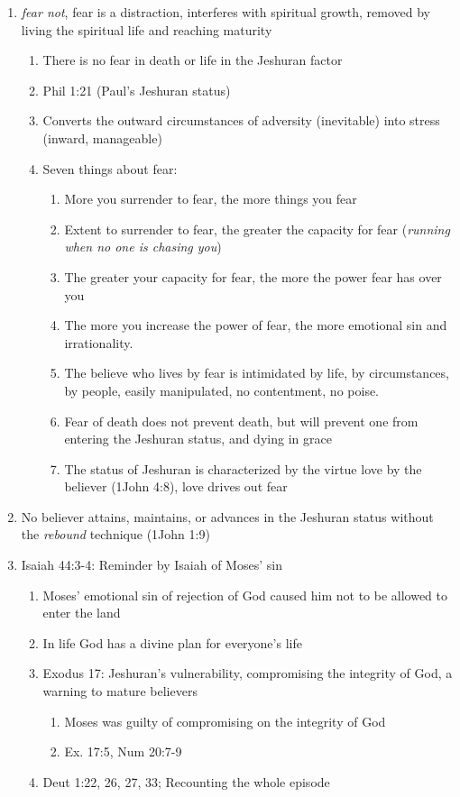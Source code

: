 \documentclass[11pt]{article}
\begin{document}
\begin{enumerate}
\begin{enumerate}
	\end{enumerate}
	\item \emph{fear not}, fear is a distraction, interferes with spiritual growth, removed by living the spiritual life and reaching maturity
	\begin{enumerate}
		\item There is no fear in death or life in the Jeshuran factor
		\item Phil 1:21 (Paul's Jeshuran status)
		\item Converts the outward circumstances of adversity (inevitable) into stress (inward, manageable)
		\item Seven things about fear:
		\begin{enumerate}
			\item More you surrender to fear, the more things you fear
			\item Extent to surrender to fear, the greater the capacity for fear (\emph{running when no one is chasing you})
			\item The greater your capacity for fear, the more the power fear has over you
			\item The more you increase the power of fear, the more emotional sin and irrationality. 
			\item The believe who lives by fear is intimidated by life, by circumstances, by people, easily manipulated, no contentment, no poise.
			\item Fear of death does not prevent death, but will prevent one from entering the Jeshuran status, and dying in grace
			\item The status of Jeshuran is characterized by the virtue love by the believer (1John 4:8), love drives out fear 
		\end{enumerate}
	\end{enumerate}
	\item No believer attains, maintains, or advances in the Jeshuran status without the \emph{rebound} technique (1John 1:9)
	
	\item Isaiah 44:3-4: Reminder by Isaiah of Moses' sin
	\begin{enumerate}
		\item Moses' emotional sin of rejection of God caused him not to be allowed to enter the land
		\item In life God has a divine plan for everyone's life
		\item Exodus 17: Jeshuran's vulnerability, compromising the integrity of God, a warning to mature believers
		\begin{enumerate}
			\item Moses was guilty of compromising on the integrity of God
			\item Ex. 17:5, Num 20:7-9
		\end{enumerate}
		\item Deut 1:22, 26, 27, 33; Recounting the whole episode
	\end{enumerate}
\end{enumerate}
\end{document}
